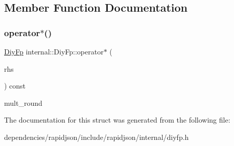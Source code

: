 \subsection{Member Function Documentation}
\mbox{\label{structinternal_1_1_diy_fp_a9868841f824924cc385ad5163c9c85b3}} 
\subsubsection{\texorpdfstring{operator$\ast$()}{operator*()}}
{\footnotesize\ttfamily \hyperlink{structinternal_1_1_diy_fp}{Diy\+Fp} internal\+::\+Diy\+Fp\+::operator$\ast$ (\begin{DoxyParamCaption}\item[{const \hyperlink{structinternal_1_1_diy_fp}{Diy\+Fp} \&}]{rhs }\end{DoxyParamCaption}) const\hspace{0.3cm}{\ttfamily [inline]}}

mult\+\_\+round 

The documentation for this struct was generated from the following file\+:\begin{DoxyCompactItemize}
\item 
dependencies/rapidjson/include/rapidjson/internal/diyfp.\+h\end{DoxyCompactItemize}
